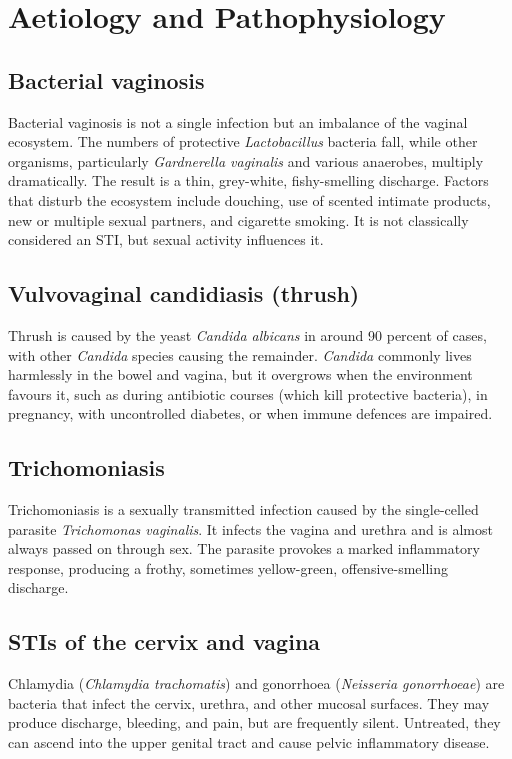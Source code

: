 \section*{Aetiology and Pathophysiology}
\subsection*{Bacterial vaginosis}
Bacterial vaginosis is not a single infection but an imbalance of the vaginal ecosystem. The numbers of protective \textit{Lactobacillus} bacteria fall, while other organisms, particularly \textit{Gardnerella vaginalis} and various anaerobes, multiply dramatically. The result is a thin, grey-white, fishy-smelling discharge. Factors that disturb the ecosystem include douching, use of scented intimate products, new or multiple sexual partners, and cigarette smoking. It is not classically considered an STI, but sexual activity influences it.

\subsection*{Vulvovaginal candidiasis (thrush)}
Thrush is caused by the yeast \textit{Candida albicans} in around 90 percent of cases, with other \textit{Candida} species causing the remainder. \textit{Candida} commonly lives harmlessly in the bowel and vagina, but it overgrows when the environment favours it, such as during antibiotic courses (which kill protective bacteria), in pregnancy, with uncontrolled diabetes, or when immune defences are impaired.

\subsection*{Trichomoniasis}
Trichomoniasis is a sexually transmitted infection caused by the single-celled parasite \textit{Trichomonas vaginalis}. It infects the vagina and urethra and is almost always passed on through sex. The parasite provokes a marked inflammatory response, producing a frothy, sometimes yellow-green, offensive-smelling discharge.

\subsection*{STIs of the cervix and vagina}
Chlamydia (\textit{Chlamydia trachomatis}) and gonorrhoea (\textit{Neisseria gonorrhoeae}) are bacteria that infect the cervix, urethra, and other mucosal surfaces. They may produce discharge, bleeding, and pain, but are frequently silent. Untreated, they can ascend into the upper genital tract and cause pelvic inflammatory disease.

